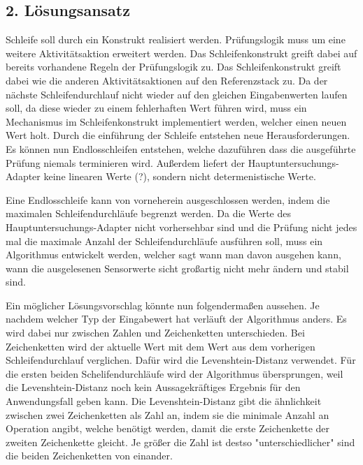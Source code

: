 \documentclass{article}
\begin{document}
    \subsection{2. Lösungsansatz}
    Schleife soll durch ein Konstrukt realisiert werden.
    Prüfungslogik muss um eine weitere Aktivitätsaktion erweitert werden. Das Schleifenkonstrukt greift dabei auf bereits vorhandene Regeln der Prüfungslogik zu.
    Das Schleifenkonstrukt greift dabei wie die anderen Aktivitätsaktionen auf den Referenzstack zu. Da der nächste Schleifendurchlauf nicht wieder auf den gleichen Eingabenwerten laufen soll, da diese wieder zu einem fehlerhaften Wert führen wird, muss ein Mechanismus im Schleifenkonstrukt implementiert werden, welcher einen neuen Wert holt.
    Durch die einführung der Schleife entstehen neue Herausforderungen. Es können nun Endlosschleifen entstehen, welche dazuführen dass die ausgeführte Prüfung niemals terminieren wird. Außerdem liefert der Hauptuntersuchungs-Adapter keine linearen Werte (?), sondern nicht determenistische Werte.

    Eine Endlosschleife kann von vorneherein ausgeschlossen werden, indem die maximalen Schleifendurchläufe begrenzt werden. 
    Da die Werte des Hauptuntersuchungs-Adapter nicht vorhersehbar sind und die Prüfung nicht jedes mal die maximale Anzahl der Schleifendurchläufe ausführen soll, muss ein Algorithmus entwickelt werden, welcher sagt wann man davon ausgehen kann, wann die ausgelesenen Sensorwerte sicht großartig nicht mehr ändern und stabil sind.
    
    Ein möglicher Lösungsvorschlag könnte nun folgendermaßen aussehen. 
    Je nachdem welcher Typ der Eingabewert hat verläuft der Algorithmus anders. Es wird dabei nur zwischen Zahlen und Zeichenketten unterschieden. 
    Bei Zeichenketten wird der aktuelle Wert mit dem Wert aus dem vorherigen Schleifendurchlauf verglichen. Dafür wird die Levenshtein-Distanz verwendet. Für die ersten beiden Schelifendurchläufe wird der Algorithmus übersprungen, weil die Levenshtein-Distanz noch kein Aussagekräftiges Ergebnis für den Anwendungsfall geben kann.
    Die Levenshtein-Distanz gibt die ähnlichkeit zwischen zwei Zeichenketten als Zahl an, indem sie die minimale Anzahl an Operation angibt, welche benötigt werden, damit die erste Zeichenkette der zweiten Zeichenkette gleicht. Je größer die Zahl ist destso "unterschiedlicher" sind die beiden Zeichenketten von einander. 
\end{document}

